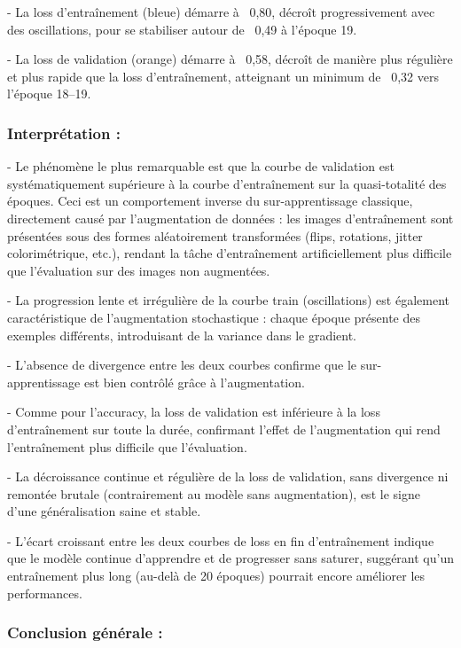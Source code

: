 - La loss d'entraînement (bleue) démarre à ~0,80, décroît progressivement avec des oscillations, pour se stabiliser autour de ~0,49 à l'époque 19.

- La loss de validation (orange) démarre à ~0,58, décroît de manière plus régulière et plus rapide que la loss d'entraînement, atteignant un minimum de ~0,32 vers l'époque 18–19.

\subsubsection{Interprétation :}

- Le phénomène le plus remarquable est que la courbe de validation est systématiquement supérieure à la courbe d'entraînement sur la quasi-totalité des époques. Ceci est un comportement inverse du sur-apprentissage classique, directement causé par l'augmentation de données : les images d'entraînement sont présentées sous des formes aléatoirement transformées (flips, rotations, jitter colorimétrique, etc.), rendant la tâche d'entraînement artificiellement plus difficile que l'évaluation sur des images non augmentées.

- La progression lente et irrégulière de la courbe train (oscillations) est également caractéristique de l'augmentation stochastique : chaque époque présente des exemples différents, introduisant de la variance dans le gradient.

- L'absence de divergence entre les deux courbes confirme que le sur-apprentissage est bien contrôlé grâce à l'augmentation.

- Comme pour l'accuracy, la loss de validation est inférieure à la loss d'entraînement sur toute la durée, confirmant l'effet de l'augmentation qui rend l'entraînement plus difficile que l'évaluation.

- La décroissance continue et régulière de la loss de validation, sans divergence ni remontée brutale (contrairement au modèle sans augmentation), est le signe d'une généralisation saine et stable.

- L'écart croissant entre les deux courbes de loss en fin d'entraînement indique que le modèle continue d'apprendre et de progresser sans saturer, suggérant qu'un entraînement plus long (au-delà de 20 époques) pourrait encore améliorer les performances.

\subsubsection{ Conclusion générale :}

